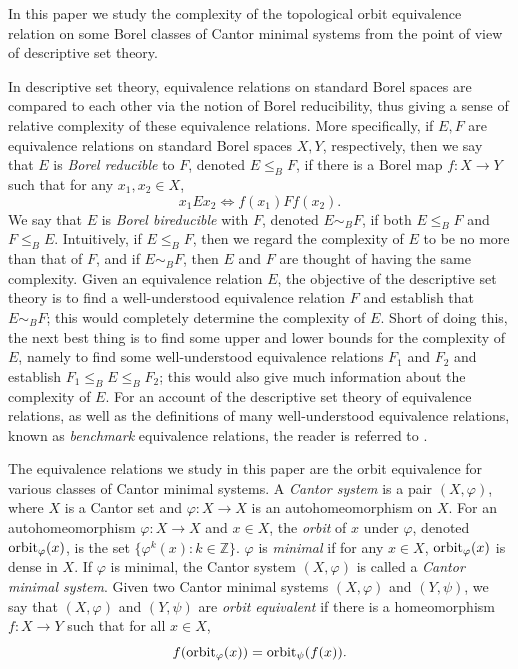 \documentclass{amsart}
\theoremstyle{definition}
\theoremstyle{problem}
\theoremstyle{remark}
\numberwithin{equation}{section}
\newcommand{\orb}{\mbox{\rm orbit}}
\begin{document}
In this paper we study the complexity of the topological orbit equivalence relation on some Borel classes of Cantor minimal systems from the point of view of descriptive set theory. 

In descriptive set theory, equivalence relations on standard Borel spaces are compared to each other via the notion of Borel reducibility, thus giving a sense of relative complexity of these equivalence relations. More specifically, if $E, F$ are equivalence relations on standard Borel spaces $X, Y$, respectively, then we say that $E$ is {\em Borel reducible} to $F$, denoted $E\leq_B F$, if there is a Borel map $f\colon X\to Y$ such that for any $x_1, x_2\in X$, 
$$ x_1Ex_2\iff f(x_1)Ff(x_2). $$
We say that $E$ is {\em Borel bireducible} with $F$, denoted $E\sim_B F$, if both $E\leq_B F$ and $F\leq_B E$. Intuitively, if $E\leq_B F$, then we regard the complexity of $E$ to be no more than that of $F$, and if $E\sim_B F$, then $E$ and $F$ are thought of having the same complexity. Given an equivalence relation $E$, the objective of the descriptive set theory is to find a well-understood equivalence relation $F$ and establish that $E\sim_B F$; this would completely determine the complexity of $E$. Short of doing this, the next best thing is to find some upper and lower bounds for the complexity of $E$, namely to find some well-understood equivalence relations $F_1$ and $F_2$ and establish $F_1\leq_B E \leq_B F_2$; this would also give much information about the complexity of $E$. For an account of the descriptive set theory of equivalence relations, as well as the definitions of many well-understood equivalence relations, known as {\em benchmark} equivalence relations, the reader is referred to \cite{GaoBook}.


The equivalence relations we study in this paper are the orbit equivalence for various classes of Cantor minimal systems. A {\em Cantor system} is a pair $(X, \varphi)$, where $X$ is a Cantor set and $\varphi\colon X\to X$ is an autohomeomorphism on $X$. For an autohomeomorphism $\varphi\colon X\to X$ and $x\in X$, the {\em orbit} of $x$ under $\varphi$, denoted $\orb_\varphi(x)$, is the set $\{\varphi^k(x)\colon k\in\mathbb{Z}\}$. $\varphi$ is {\em minimal} if for any $x\in X$, $\orb_\varphi(x)$ is dense in $X$. If $\varphi$ is minimal, the Cantor system $(X, \varphi)$ is called a {\em Cantor minimal system}. Given two Cantor minimal systems $(X, \varphi)$ and $(Y, \psi)$, we say that $(X, \varphi)$ and $(Y, \psi)$ are {\em orbit equivalent} if there is a homeomorphism $f\colon X\to Y$ such that for all $x\in X$, 
$$ f(\orb_\varphi(x))=\orb_\psi(f(x)). $$
\end{document}
